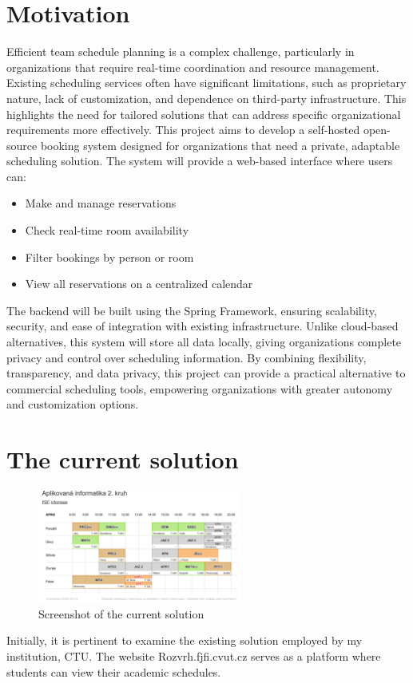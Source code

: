 \section*{Motivation}
Efficient team schedule planning is a complex challenge, particularly in organizations that require real-time coordination and resource management.
Existing scheduling services often have significant limitations, such as proprietary nature, lack of customization, and dependence on third-party infrastructure.
This highlights the need for tailored solutions that can address specific organizational requirements more effectively.
This project aims to develop a self-hosted open-source booking system designed for organizations that need a private, adaptable scheduling solution.
The system will provide a web-based interface where users can:
\begin{itemize}
    \item Make and manage reservations
    \item Check real-time room availability
    \item  Filter bookings by person or room
    \item View all reservations on a centralized calendar
\end{itemize}

The backend will be built using the Spring Framework, ensuring scalability, security, and ease of integration with existing infrastructure.
Unlike cloud-based alternatives, this system will store all data locally, giving organizations complete privacy and control over scheduling information.
By combining flexibility, transparency, and data privacy, this project can provide a practical alternative to commercial scheduling tools, empowering organizations with greater autonomy and customization options.
\newpage

\pagestyle{headings}



\section{The current solution}\label{sec:the-current-solution}
\begin{figure}[h]
    \centering
    \includegraphics[width=0.6\textwidth]{img}
    \caption{Screenshot of the current solution}
    \label{fig:rozvrh}
\end{figure}
Initially, it is pertinent to examine the existing solution employed by my institution, CTU. The website Rozvrh.fjfi.cvut.cz serves as a platform where students can view their academic schedules.

